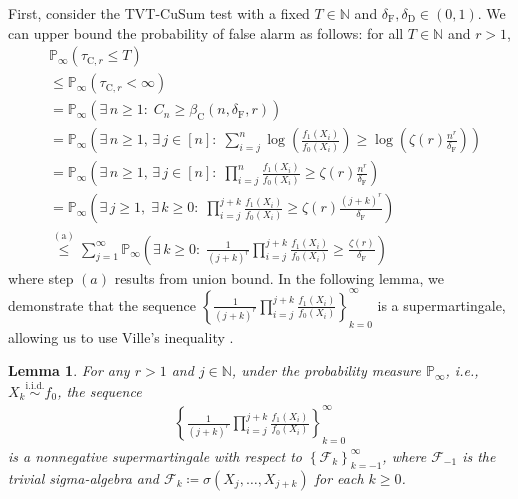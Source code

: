 \documentclass[12pt]{interact}
\newcommand{\aaaa}{\mathrm{(a)}}
\newcommand{\lp}{\left(}
\newcommand{\rp}{\right)}
\newcommand{\lb}{\left[}
\newcommand{\rb}{\right]}
\newcommand{\lbp}{\left\{}
\newcommand{\rbp}{\right\}}
\newcommand{\mrm}{\mathrm}
\newcommand{\mbb}{\mathbb}
\newcommand{\diid}{\overset{\text{i.i.d.}}{\sim}}
\renewcommand{\Pr}{\mathbb{P}}
\theoremstyle{plain}
\newtheorem{lemma}{Lemma}
\newcommand{\vvv}[1]{{\color{red}{#1}}}
\newcommand{\yhh}[1]{{\color{purple}{#1}}}
\begin{document}
First, consider the TVT-CuSum test with a fixed $T \in \mbb{N}$ and $\delta_{\mrm{F}}, \delta_{\mrm{D}} \in \lp 0, 1 \rp$. We can upper bound the probability of false alarm as follows: for all $T\in\mbb{N}$ and $r > 1$,
%
\begin{align}
&\Pr_{\infty}\lp\tau_{\mrm{C},r}\leq T\rp \nonumber\\
&\leq\Pr_{\infty}\lp\tau_{\mrm{C},r}<\infty\rp \nonumber\\
&=\Pr_{\infty}\lp\exists\,n\geq1:\;C_{n}\geq\beta_{\mrm{C}}\lp n,\delta_{\mathrm{F}},r\rp\rp \nonumber\\
&=\Pr_{\infty}\lp\exists\,n\geq1,\,\exists\,j\in\lb n\rb:\; \sum_{i=j}^{n}\log\lp\frac{f_{1}\lp X_{i}\rp}{f_{0}\lp X_{i}\rp}\rp\geq\log\lp\zeta\lp r\rp\frac{n^{r}}{\delta_{\mathrm{F}}}\rp\rp \nonumber\\
&=\Pr_{\infty}\lp\exists\,n\geq1,\,\exists\,j\in\lb n\rb:\; \prod_{i=j}^{n}\frac{f_{1}\lp X_{i}\rp}{f_{0}\lp X_{i}\rp}\geq\zeta\lp r\rp\frac{n^{r}}{\delta_{\mathrm{F}}}\rp\nonumber\\
&=\Pr_{\infty}\left(\exists\,j\geq1,\;\exists\,k\geq0:\;\prod_{i=j}^{j+k}\frac{f_{1}\lp X_{i}\rp}{f_{0}\lp X_{i}\rp}\geq\zeta\lp r\rp\frac{\lp j+k\rp^{r}}{\delta_{\mathrm{F}}}\right)\nonumber\\
&\overset{\aaaa}{\leq}\sum_{j=1}^{\infty} \Pr_{\infty}\left(\exists\,k\geq0:\;\frac{1}{\lp j+k\rp^{r}}\prod_{i=j}^{j+k}\frac{f_{1}\lp X_{i}\rp}{f_{0}\lp X_{i}\rp}\geq\frac{\zeta\lp r\rp}{\delta_{\mathrm{F}}}\right) \label{eq:TVT-CuSum_FA_1}
\end{align}
where step $(a)$ results from union bound. In the following lemma, we demonstrate that the sequence $\lbp\frac{1}{\lp j+k\rp^{r}}\prod_{i=j}^{j+k}\frac{f_{1}\lp X_{i}\rp}{f_{0}\lp X_{i}\rp}\rbp_{k=0}^{\infty}$ is a supermartingale, allowing us to use Ville's inequality \citep{ville1939etude}.

\begin{lemma}\label{lem:sup_martin} For any 
$r>1$ and $j \in \mbb{N}$, under the probability measure $\Pr_{\infty}$, i.e., $X_{k}\diid f_{0}$, the sequence 
%
\begin{align}
\lbp\frac{1}{\lp j+k\rp^{r}}\prod_{i=j}^{j+k}\frac{f_{1}\lp X_{i}\rp}{f_{0}\lp X_{i}\rp}\rbp_{k=0}^{\infty}  
\end{align}
%
is a nonnegative supermartingale with respect to $\lbp \mathcal{F}_{k} \rbp_{k=-1}^{\infty}$, where $\mathcal{F}_{-1}$ is the trivial sigma-algebra and $\mathcal{F}_{k} \coloneqq \sigma \lp X_{j}, \dots, X_{j+k} \rp$ for each $k \geq 0$.
\end{lemma}
\end{document}
